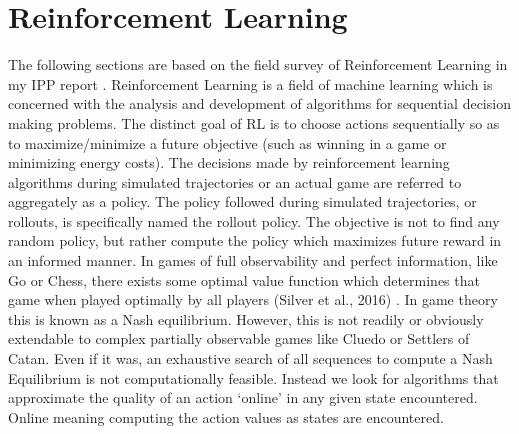 \documentclass[msc, deptreport, ai, romanprepages]{infthesis}
\begin{document}
\section{Reinforcement Learning}
The following sections are based on the field survey of Reinforcement Learning in my IPP report \cite{IPP}. Reinforcement Learning is a field of machine learning which is concerned with the analysis and development of algorithms for sequential decision making problems. The distinct goal of RL is to choose actions sequentially so as to maximize/minimize a future objective (such as winning in a game or minimizing energy costs). The decisions made by reinforcement learning algorithms during simulated trajectories or an actual game are referred to aggregately as a policy. The policy followed during simulated trajectories, or rollouts, is specifically named the rollout policy. The objective is not to find any random policy, but rather compute the policy which maximizes future reward in an informed manner. In games of full observability and perfect information, like Go or Chess, there exists some optimal value function which determines that game when played optimally by all players (Silver et al., 2016) \cite{Silver2016}. In game theory this is known as a Nash equilibrium. However, this is not readily or obviously extendable to complex partially observable games like Cluedo or Settlers of Catan. Even if it was, an exhaustive search of all sequences to compute a Nash Equilibrium is not computationally feasible. Instead we look for algorithms that approximate the quality of an action ‘online’ in any given state encountered. Online meaning computing the action values as states are encountered. 
\end{document}
